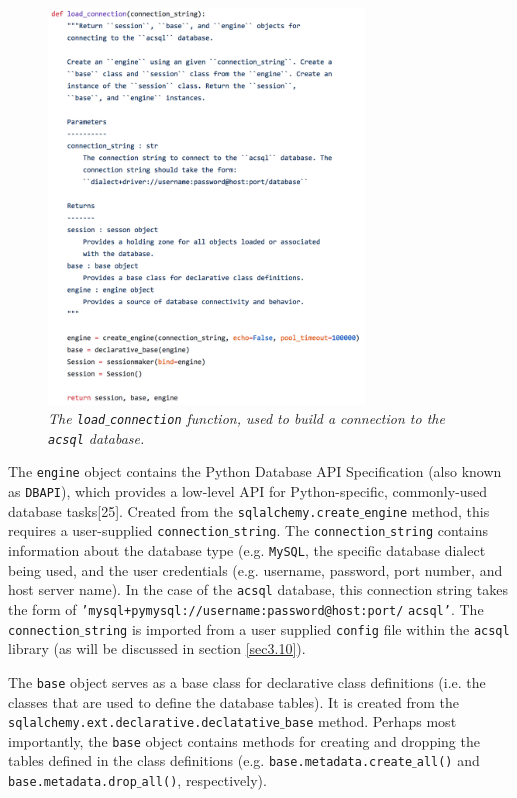 \documentclass[10pt,journal,compsoc]{IEEEtran}
\begin{document}
\begin{figure}[!h]
\centering
\includegraphics[width=3.3in]{./figures/load_connection.png}
\caption{\textit{The \texttt{load$\_$connection} function, used to build a connection to the \texttt{acsql} database.}}
\label{fig12}
\end{figure}

The \texttt{engine} object contains the Python Database API Specification (also known as \texttt{DBAPI}), which provides a low-level API for Python-specific, commonly-used
database tasks[25].  Created from the \texttt{sqlalchemy.create$\_$engine} method, this requires a user-supplied \texttt{connection$\_$string}.  The \texttt{connection$\_$string}
contains information about the database type (e.g. \texttt{MySQL}, the specific database dialect being used, and the user credentials (e.g. username, password, port number,
and host server name).  In the case of the \texttt{acsql} database, this connection string takes the form of \texttt{'mysql+pymysql://username:password@host:port/} \texttt{acsql'}.
The \texttt{connection$\_$string} is imported from a user supplied \texttt{config} file within the \texttt{acsql} library (as will be discussed in section \ref{sec3.10}).

The \texttt{base} object serves as a base class for declarative class definitions (i.e. the classes that are used to define the database tables).  It is created from the
\texttt{sqlalchemy.ext.declarative.declatative$\_$base} method.  Perhaps most importantly, the \texttt{base} object contains methods for creating and dropping the tables defined in
the class definitions (e.g. \texttt{base.metadata.create$\_$all()} and \texttt{base.metadata.drop$\_$all()}, respectively).
\end{document}
